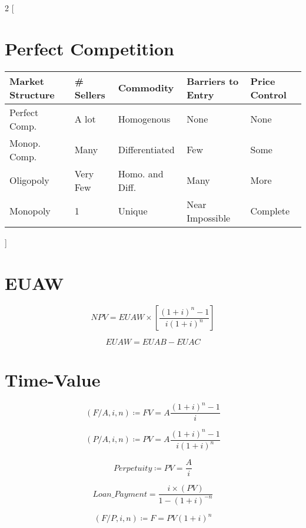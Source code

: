 \documentclass[10pt]{article}
\begin{document}
\begin{multicols*}{2}
  [
\section{Perfect Competition}
  \begin{tabular}{|l| l l l l|}
    \hline
    Market Structure & \# Sellers & Commodity & Barriers to Entry & Price Control\\
    \hline
    Perfect Comp. & A lot & Homogenous & None & None\\
    Monop. Comp. & Many & Differentiated & Few & Some\\
    Oligopoly & Very Few & Homo. and Diff. & Many & More\\
    Monopoly & 1 & Unique & Near Impossible & Complete\\
    \hline
  \end{tabular}
]

\section{EUAW}
\begin{equation*}
  NPV = EUAW \times \left[ \frac{{(1 + i)}^n - 1}{i{(1+i)}^n} \right]
\end{equation*}

\begin{equation*}
  EUAW = EUAB - EUAC
\end{equation*}

\section{Time-Value}
\begin{equation*}
  (F/A, i, n) \coloneqq FV = A\frac{{(1+i)}^n - 1}{i}
\end{equation*}

\begin{equation*}
  (P/A, i, n) \coloneqq PV = A\frac{{(1+i)}^n - 1}{i{(1+i)}^n}
\end{equation*}

\begin{equation*}
  Perpetuity \coloneqq PV = \frac{A}{i}
\end{equation*}

\begin{equation*}
  Loan\_Payment =  \frac{i\times (PV)}{1-{(1+i)}^{-n}}
\end{equation*}

\begin{equation*}
  (F/P, i, n) \coloneqq F = PV{(1+i)}^n
\end{equation*}


\end{multicols*}
\end{document}
